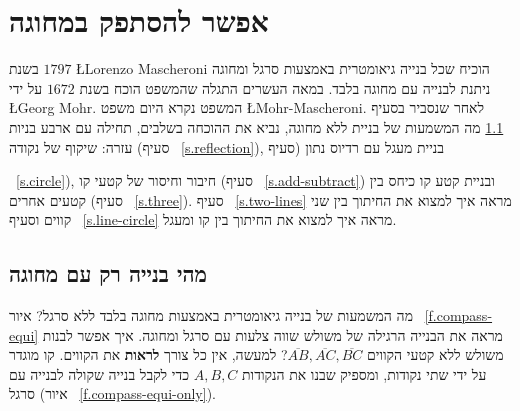 


\chapter{אפשר להסתפק במחוגה}\label{c.compass}


בשנת
$1797$
\L{Lorenzo Mascheroni}
הוכיח שכל בנייה גיאומטרית באמצעות סרגל ומחוגה ניתנת לבנייה עם מחוגה בלבד. במאה העשרים התגלה שהמשפט הוכח בשנת
$1672$
על ידי
\L{Georg Mohr}.
המשפט נקרא היום משפט
\L{Mohr-Mascheroni}.
לאחר שנסביר בסעיף%
~\ref{s.compass-what}
מה המשמעות של בניית ללא מחוגה, נביא את ההוכחה בשלבים, תחילה עם ארבע בניות עזרה: שיקוף של נקודה (סעיף%
~\ref{s.reflection}),
בניית מעגל עם רדיוס נתון (סעיף%

~\ref{s.circle}),
חיבור וחיסור של קטעי קו (סעיף%
~\ref{s.add-subtract})
ובניית קטע קו כיחס בין קטעים אחרים (סעיף%
~\ref{s.three}).
סעיף%
~\ref{s.two-lines}
מראה איך למצוא את החיתוך בין שני קווים וסעיף%
~\ref{s.line-circle}
מראה איך למצוא את החיתוך בין קו ומעגל.


\section{מהי בנייה רק עם מחוגה}\label{s.compass-what}

מה המשמעות של בנייה גיאומטרית באמצעות  מחוגה בלבד ללא סרגל? איור%
~\ref{f.compass-equi}
מראה את הבנייה הרגילה של משולש שווה צלעות עם סרגל ומחוגה. איך אפשר לבנות משולש ללא קטעי הקווים
$\overline{AB},\overline{AC},\overline{BC}$?
למעשה, אין כל צורך
\textbf{לראות}
את הקווים. קו מוגדר על ידי שתי נקודות, ומספיק שבנו את הנקודות 
$A,B,C$
 כדי לקבל בנייה שקולה לבנייה עם סרגל (איור%
~\ref{f.compass-equi-only}).

